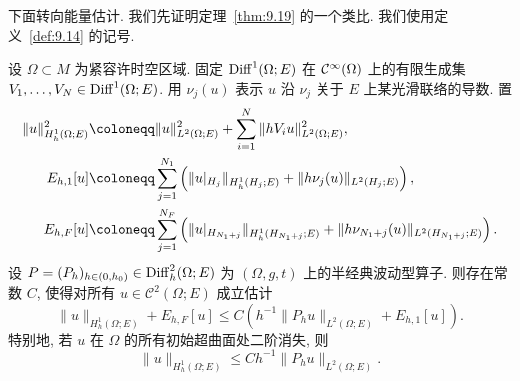 下面转向能量估计. 我们先证明定理~\ref{thm:9.19} 的一个类比. 我们使用定义~\ref{def:9.14} 的记号.

\begin{theorem}[半经典能量估计]\label{thm:9.44}
设 $\Omega \subset M$ 为紧容许时空区域. 固定 $\operatorname{Diff}^1(\Omega; E)$ 在 $\mathcal{C}^\infty(\Omega)$ 上的有限生成集 $V_1, \ldots, V_N \in \operatorname{Diff}^1(\Omega; E)$. 用 $\nu_j(u)$ 表示 $u$ 沿 $\nu_j$ 关于 $E$ 上某光滑联络的导数. 置
\begin{equation}\label{eq:9.135}
    \begin{aligned}
        \|u\|_{H_h^1(\Omega; E)}^2 &\defeq \|u\|_{L^2(\Omega; E)}^2 + \sum_{i=1}^{N} \|h V_i u\|_{L^2(\Omega; E)}^2, \\
        E_{h,1}[u] &\defeq \sum_{j=1}^{N_1} \left( \|u|_{H_j}\|_{H_h^1(H_j; E)} + \|h \nu_j(u)\|_{L^2(H_j; E)} \right), \\
        E_{h,F}[u] &\defeq \sum_{j=1}^{N_F} \left( \|u|_{H_{N_1+j}}\|_{H_h^1(H_{N_1+j}; E)} + \|h \nu_{N_1+j}(u)\|_{L^2(H_{N_1+j}; E)} \right).
    \end{aligned}
\end{equation}
设 $P = (P_h)_{h \in (0, h_0)} \in \operatorname{Diff}_h^2(\Omega; E)$ 为 $(\Omega, g, t)$ 上的半经典波动型算子. 则存在常数 $C$, 使得对所有 $u \in \mathcal{C}^2(\Omega; E)$ 成立估计
\begin{equation}\label{eq:9.136}
    \|u\|_{H_h^1(\Omega; E)} + E_{h,F}[u] \le C \left( h^{-1} \|P_h u\|_{L^2(\Omega; E)} + E_{h,1}[u] \right).
\end{equation}
特别地, 若 $u$ 在 $\Omega$ 的所有初始超曲面处二阶消失, 则
\begin{equation}\label{eq:9.137}
    \|u\|_{H_h^1(\Omega; E)} \le C h^{-1} \|P_h u\|_{L^2(\Omega; E)}.
\end{equation}
\end{theorem}

